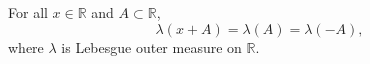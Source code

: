 For all $x \in \mathbb{R}$ and $A \subset \mathbb{R}$,
$$\lambda(x + A) = \lambda(A) = \lambda(-A),$$
where $\lambda$ is Lebesgue outer measure on $\mathbb{R}$.